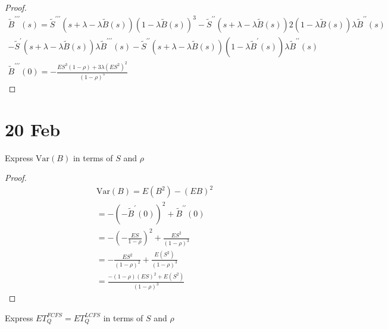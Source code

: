 \begin{proof}
\begin{gather*}
    \widetilde{B}^{\prime\prime\prime}(s)
    = \widetilde{S}^{\prime\prime\prime}(s + \lambda - \lambda \widetilde{B}(s))(1 - \lambda \widetilde{B}(s))^3
    - \widetilde{S}^{\prime\prime}(s + \lambda - \lambda \widetilde{B}(s)) 2 (1 - \lambda \widetilde{B}(s)) \lambda \widetilde{B}^{\prime\prime}(s)\\
    - \widetilde{S}^{\prime}(s + \lambda - \lambda \widetilde{B}(s)) \lambda \widetilde{B}^{\prime\prime\prime}(s)
    - \widetilde{S}^{\prime\prime}(s + \lambda - \lambda \widetilde{B}(s)) (1 - \lambda \widetilde{B}^{\prime}(s)) \lambda \widetilde{B}^{\prime\prime}(s)\\
    \widetilde{B}^{\prime\prime\prime}(0) = -\frac{ES^3 (1 - \rho) + 3 \lambda (ES^2)^2}{(1 - \rho)^5}
\end{gather*}
\end{proof}
\vskip 0.6in



\section{20 Feb}

\begin{prob}
Express $\text{Var}(B)$ in terms of $S$ and $\rho$
\end{prob}

\begin{proof}
\begin{gather*}
    \text{Var}(B) = E(B^2) - (EB)^2\\
    = -(-\widetilde{B}^{\prime}(0))^2 + \widetilde{B}^{\prime\prime}(0)\\
    = -\left(-\frac{ES}{1 - \rho}\right)^2 + \frac{ES^2}{(1 - \rho)^3}\\
    = -\frac{ES^2}{(1 - \rho)^2} + \frac{E(S^2)}{(1 - \rho)^3}\\
    = \frac{-(1 - \rho)(ES)^2 + E(S^2)}{(1 - \rho)^3}
\end{gather*}
\end{proof}
\vskip 0.6in




\begin{prob}
Express $ET_{Q}^{FCFS} = ET_{Q}^{LCFS}$ in terms of $S$ and $\rho$
\end{prob}

